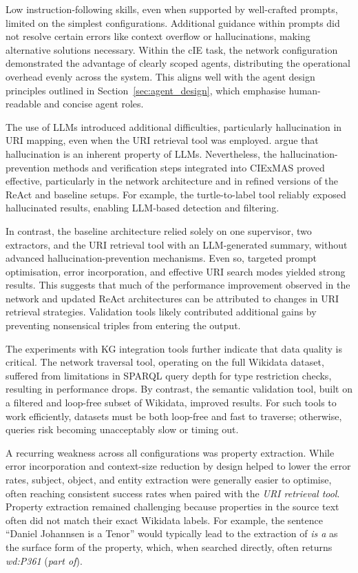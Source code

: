 \documentclass[a4paper,oneside,bibliography=totoc]{scrbook}
\begin{document}
Low instruction-following skills, even when supported by well-crafted prompts, limited on the simplest configurations. Additional guidance within prompts did not resolve certain errors like context overflow or hallucinations, making alternative solutions necessary. Within the \ac{cIE} task, the network configuration demonstrated the advantage of clearly scoped agents, distributing the operational overhead evenly across the system. This aligns well with the agent design principles outlined in Section~\ref{sec:agent_design}, which emphasise human-readable and concise agent roles.

The use of \acp{LLM} introduced additional difficulties, particularly hallucination in \ac{URI} mapping, even when the \ac{URI} retrieval tool was employed. \citet{Xu2025} argue that hallucination is an inherent property of \acp{LLM}. Nevertheless, the hallucination-prevention methods and verification steps integrated into CIExMAS proved effective, particularly in the network architecture and in refined versions of the ReAct and baseline setups. For example, the turtle-to-label tool reliably exposed hallucinated results, enabling \ac{LLM}-based detection and filtering.

In contrast, the baseline architecture relied solely on one supervisor, two extractors, and the \ac{URI} retrieval tool with an \ac{LLM}-generated summary, without advanced hallucination-prevention mechanisms. Even so, targeted prompt optimisation, error incorporation, and effective \ac{URI} search modes yielded strong results. This suggests that much of the performance improvement observed in the network and updated ReAct architectures can be attributed to changes in \ac{URI} retrieval strategies. Validation tools likely contributed additional gains by preventing nonsensical triples from entering the output.

The experiments with \ac{KG} integration tools further indicate that data quality is critical. The network traversal tool, operating on the full Wikidata dataset, suffered from limitations in \ac{SPARQL} query depth for type restriction checks, resulting in performance drops. By contrast, the semantic validation tool, built on a filtered and loop-free subset of Wikidata, improved results. For such tools to work efficiently, datasets must be both loop-free and fast to traverse; otherwise, queries risk becoming unacceptably slow or timing out.

A recurring weakness across all configurations was property extraction. While error incorporation and context-size reduction by design helped to lower the error rates, subject, object, and entity extraction were generally easier to optimise, often reaching consistent success rates when paired with the \textit{\ac{URI} retrieval tool}. Property extraction remained challenging because properties in the source text often did not match their exact Wikidata labels. For example, the sentence \enquote{Daniel Johannsen is a Tenor} would typically lead to the extraction of \textit{is a} as the surface form of the property, which, when searched directly, often returns \textit{wd:P361} (\textit{part of}).
\end{document}
